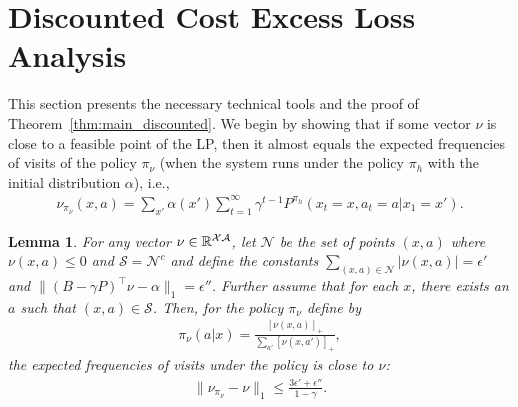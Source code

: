 \documentclass[11pt]{article}
\newtheorem{lemma}[theorem]{Lemma}
\begin{document}
\section{Discounted Cost Excess Loss Analysis}
\label{sec:main_discounted_proof}
This section presents the necessary technical tools and the proof of Theorem~\ref{thm:main_discounted}. We begin by showing that if some vector $\nu$ is close to a feasible point of the LP, then it almost equals the expected frequencies of visits of the policy $\pi_\nu$ (when the system runs under the policy $\pi_{h}$ with the initial distribution $\alpha$), i.e.,
  \begin{eqnarray}
    \nu_{\pi_\nu}(x,a) =\sum_{x'} \alpha(x') \sum_{t=1}^{\infty} \gamma^{t-1} P^{\pi_{h}}\left(x_t=x, a_t=a| x_1 =x' \right).
    \label{eq:mu_pi_h}
  \end{eqnarray}
\begin{lemma}
  \label{lemma:key_discounted}
  For any vector $\nu \in \mathbb{R}^{{\cal X}{\cal A}}$, let $\mathcal{N}$ be the set of points $(x,a)$ where $\nu(x,a)\leq 0$ and $\mathcal{S}=\mathcal{N}^c$ and define the constants $\sum_{(x,a) \in \mathcal{N}} | \nu(x,a)| = \epsilon'$ and $\|(B-\gamma P)^\top \nu -\alpha\|_1=\epsilon''$. Further assume that for each $x$, there exists an $a$ such that $(x,a) \in \mathcal{S}$. Then, for the policy $\pi_{\nu}$ define by
   \begin{eqnarray}
    \pi_{\nu}(a|x)
     = \frac{[\nu(x,a)]_{+}}{\sum_{a'} [\nu(x,a')]_{+}},
    \label{eq:pi_nu}
   \end{eqnarray}
the expected frequencies of visits under the policy is close to $\nu$:
  \begin{eqnarray*}
    \|\nu_{\pi_\nu}- \nu\|_{1} \leq \frac{3 \epsilon' + \epsilon''}{1-\gamma}.
  \end{eqnarray*}
\end{lemma}
\end{document}
